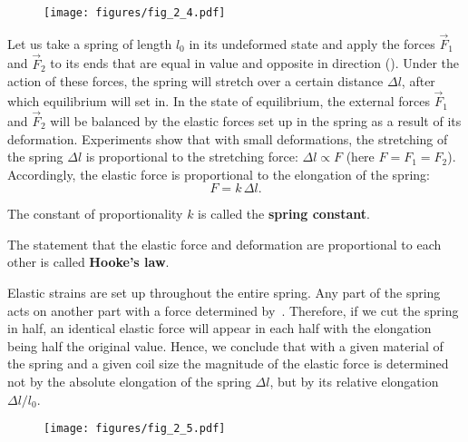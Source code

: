 \begin{figure}[t]
	\begin{center}
		\texttt{[image: figures/fig\_2\_4.pdf]}
		\caption[]{}
		\label{fig:2_4}
	\end{center}
	\vspace{-0.8cm}
\end{figure}

Let us take a spring of length $l_0$ in its undeformed state and apply the forces $\vec{F}_1$ and $\vec{F}_2$ to its ends that are equal in value and opposite in direction (). Under the action of these forces, the spring will stretch over a certain distance $\Delta l$, after which equilibrium will set in. In the state of equilibrium, the external forces $\vec{F}_1$ and $\vec{F}_2$ will be balanced by the elastic forces set up in the spring as a result of its deformation. Experiments show that with small deformations, the stretching of the spring $\Delta l$ is proportional to the stretching force: $\Delta l\propto F$ (here $F=F_1=F_2$). Accordingly, the elastic force is proportional to the elongation of the spring:
\begin{equation}\label{eq:2_25}
F = k\,\Delta l.
\end{equation}

\noindent
The constant of proportionality $k$ is called the \textbf{spring constant}.

The statement that the elastic force and deformation are proportional to each other is called \textbf{Hooke's law}.

Elastic strains are set up throughout the entire spring. Any part of the spring acts on another part with a force determined by~. Therefore, if we cut the spring in half, an identical elastic force will appear in each half with the elongation being half the original value. Hence, we conclude that with a given material of the spring and a given coil size the magnitude of the elastic force is determined not by the absolute elongation of the spring $\Delta l$, but by its relative elongation $\Delta l/l_0$.

\begin{figure}[t]
	\begin{center}
		\texttt{[image: figures/fig\_2\_5.pdf]}
		\caption[]{}
		\label{fig:2_5}
	\end{center}
	\vspace{-0.7cm}
\end{figure}

